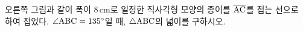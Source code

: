 \noindent\begin{minipage}[t]{0.58\linewidth}\vspace{0pt}\raggedright 오른쪽 그림과 같이 폭이 $8\,\mathrm{cm}$로 일정한 직사각형 모양의 종이를 $\overline{\mathrm{AC}}$를 접는 선으로 하여 접었다. $\angle\mathrm{ABC}=135^\circ$일 때, $\triangle\mathrm{ABC}$의 넓이를 구하시오.\end{minipage}\hfill\begin{minipage}[t]{0.4\linewidth}\vspace{0pt}\centering \resizebox{\ifdim\width>\linewidth\linewidth\else\width\fi}{!}{}\end{minipage}\par
